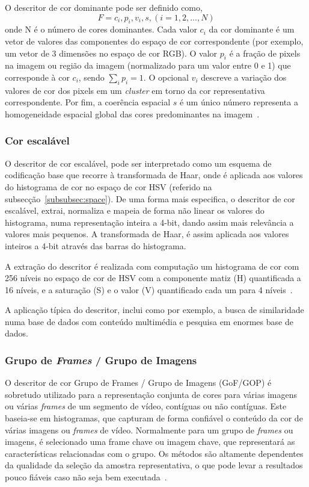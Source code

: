 O descritor de cor dominante pode ser definido como,
\[ F = {{c_{i}, p_{i}, v_{i}},s}, (i=1,2,...,N) \]
onde N é o número de cores dominantes. Cada valor $ c_{i} $ da cor dominante é um vetor de valores das componentes do espaço de cor correspondente (por exemplo, um vetor de 3 dimensões no espaço de cor RGB). O valor $ p_{i} $ é a fração de pixels na imagem ou região da imagem (normalizado para um valor entre 0 e 1) que corresponde à cor $ c_{i} $, sendo $  \sum_i p_{i} = 1 $. O opcional $ v_{i} $ descreve a variação dos valores de cor dos pixels em um \textit{cluster} em torno da cor representativa correspondente. Por fim, a coerência espacial $ s $ é um único número  representa a homogeneidade espacial global das cores predominantes na imagem~\cite{Ite-vil}.

\subsubsection{Cor escalável}

O descritor de cor escalável, pode ser interpretado como um esquema de codificação base que recorre à transformada de Haar, onde é aplicada aos valores do histograma de cor no espaço de cor HSV (referido na subsecção~\ref{subsubsec:space}). De uma forma mais especifica, o descritor de cor escalável, extrai, normaliza e mapeia de forma não linear os valores do histograma, numa representação inteira a 4-bit, dando assim mais relevância a valores mais pequenos. A transformada de Haar, é assim aplicada aos valores inteiros a 4-bit através das barras do histograma. 

A extração do descritor é realizada com computação um histograma de cor com 256 níveis no espaço de cor de HSV com a componente matiz (H) quantificada a 16 níveis, e a saturação (S) e o valor (V) quantificado cada um para 4 níveis~\cite{Christopoulos2000}. 

A aplicação típica do descritor, inclui como por exemplo, a busca de similaridade numa base de dados com conteúdo multimédia e pesquisa em enormes base de dados. 

\subsubsection{Grupo de \textit{Frames} / Grupo de Imagens}

O descritor de cor Grupo de Frames / Grupo de Imagens (GoF/GOP) é sobretudo utilizado para a representação conjunta de cores para várias imagens ou várias \textit{frames} de um segmento de vídeo, contíguas ou não contíguas. Este baseia-se em histogramas, que capturam de forma confiável o conteúdo da cor de várias imagens ou \textit{frames} de vídeo. Normalmente para um grupo de \textit{frames} ou imagens, é selecionado uma frame chave ou imagem chave, que representará as características relacionadas com o grupo. Os métodos são altamente dependentes da qualidade da seleção da amostra representativa, o que pode levar a resultados pouco fiáveis caso não seja bem executada~\cite{Ite-vil}.

